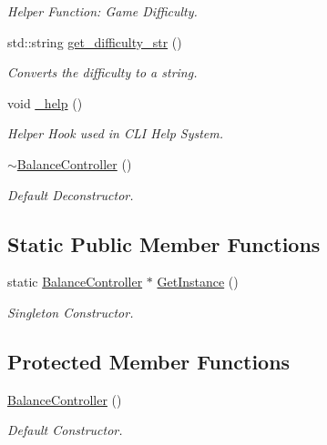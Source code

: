 \begin{DoxyCompactItemize}
\begin{DoxyCompactList}\small\item\em Helper Function\+: Game Difficulty. \end{DoxyCompactList}\item 
std\+::string \mbox{\hyperlink{classBalanceController_a882a510066a59049b37bacd83a303267}{get\+\_\+difficulty\+\_\+str}} ()
\begin{DoxyCompactList}\small\item\em Converts the difficulty to a string. \end{DoxyCompactList}\item 
\mbox{\label{classBalanceController_a8936276becef1b520f9b92984e9cf46f}} 
void \mbox{\hyperlink{classBalanceController_a8936276becef1b520f9b92984e9cf46f}{\+\_\+help}} ()
\begin{DoxyCompactList}\small\item\em Helper Hook used in C\+LI Help System. \end{DoxyCompactList}\item 
\mbox{\label{classBalanceController_a59d36764e3b3c8121577eb9d699a2d49}} 
\mbox{\hyperlink{classBalanceController_a59d36764e3b3c8121577eb9d699a2d49}{$\sim$\+Balance\+Controller}} ()
\begin{DoxyCompactList}\small\item\em Default Deconstructor. \end{DoxyCompactList}\end{DoxyCompactItemize}
\subsection*{Static Public Member Functions}
\begin{DoxyCompactItemize}
\item 
static \mbox{\hyperlink{classBalanceController}{Balance\+Controller}} $\ast$ \mbox{\hyperlink{classBalanceController_a570c607b223a0a9c033603e833458251}{Get\+Instance}} ()
\begin{DoxyCompactList}\small\item\em Singleton Constructor. \end{DoxyCompactList}\end{DoxyCompactItemize}
\subsection*{Protected Member Functions}
\begin{DoxyCompactItemize}
\item 
\mbox{\hyperlink{classBalanceController_a525efc25f5f4876cbff5ca052d7c55f6}{Balance\+Controller}} ()
\begin{DoxyCompactList}\small\item\em Default Constructor. \end{DoxyCompactList}\end{DoxyCompactItemize}
